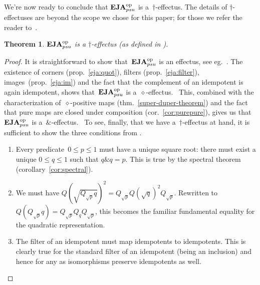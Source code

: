 \documentclass[submission,copyright,creativecommons]{eptcs}
\newcounter{main}
\newtheorem{theorem}[main]{Theorem}
\theoremstyle{definition}
\newcommand{\EJA}{\text{\textbf{EJA}}\xspace}
\newcommand{\asrt}{\mathrm{asrt}}
\newcommand{\opp}{\mathrm{op}}
\begin{document}

We're now ready to conclude that
    $\EJA_{psu}^{\opp}$
    is a~$\dagger$-effectus.
The details of $\dagger$-effectuses are beyond the scope we chose for this paper;
for those we refer the reader to~\cite[\S173--215]{basthesis}.
\begin{theorem}
    $\EJA_{psu}^{\opp}$ is a $\dagger$-effectus (as defined in \cite[\S215]{basthesis}).
\end{theorem}
\begin{proof}
It is straightforward to show that~$\EJA_{psu}^\opp$
    is an effectus, see eg.~\cite[\S191]{basthesis}.
    The existence of corners (prop.~\ref{eja:quot}),
    filters (prop.~\ref{eja:filter}), images~(prop.~\ref{eja:im})
    and the fact that the complement of an idempotent is again idempotent,
    shows that~$\EJA_{psu}^\opp$ is a~$\diamond$-effectus.~\cite[\S206]{basthesis}
This, combined with  the characterization of~$\diamond$-positive maps (thm.~\ref{super-duper-theorem})
    and the fact that pure maps are closed under composition (cor.~\ref{cor:purepure}),
    gives us that~$\EJA_{psu}^\opp$ is a~$\&$-effectus.~\cite[\S211]{basthesis}
To see, finally, that we have a~$\dagger$-effectus at hand,
    it is sufficient to show the three conditions from \cite[\S215III]{basthesis}.
\begin{enumerate}
\item
    Every predicate~$0 \leq p\leq 1$ must have a unique square root:
	 there must exist a unique $0 \leq q\leq 1$
	such that $q\& q = p$. This is true by the spectral theorem
        (corollary~\ref{cor:spectral}).
\item
    We must have
	$Q(\sqrt{Q_{\sqrt{p}}q})^2 = Q_{\sqrt{p}}Q(\sqrt{q})^2
	Q_{\sqrt{p}}$.
        Rewritten to $Q(Q_{\sqrt{p}}q) =
	Q_{\sqrt{p}}Q_qQ_{\sqrt{p}}$, this becomes the familiar
        fundamental equality for the quadratic representation.
\item
	The filter of an idempotent must map idempotents to idempotents.
        This is clearly true for the standard filter
            of an idempotent (being an inclusion) and
            hence for any as isomorphisms preserve idempotents as well. \qedhere
\end{enumerate}
\end{proof}
\end{document}
